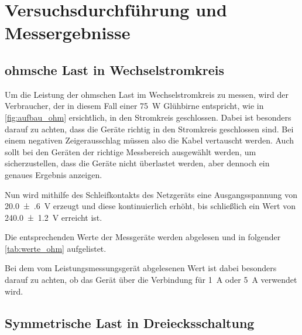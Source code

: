 \documentclass[12pt,english,ngerman]{scrartcl}
\begin{document}
\section{Versuchsdurchführung und Messergebnisse}\label{sec:versuchsdurchfuehrung_messergebnisse}

\subsection{ohmsche Last in Wechselstromkreis}

Um die Leistung der ohmschen Last im Wechselstromkreis zu messen, wird der
Verbraucher, der in diesem Fall einer \SI[]{75}{\watt} Glühbirne entspricht,
wie in \autoref{fig:aufbau_ohm} ersichtlich, in den Stromkreis geschlossen.
Dabei ist besonders darauf zu achten, dass die Geräte richtig in den Stromkreis
geschlossen sind. Bei einem negativen Zeigerausschlag müssen also die Kabel
vertauscht werden. Auch sollt bei den Geräten der richtige Messbereich
ausgewählt werden, um sicherzustellen, dass die Geräte nicht überlastet werden,
aber dennoch ein genaues Ergebnis anzeigen.

Nun wird mithilfe des Schleifkontakts des Netzgeräts eine Ausgangsspannung von
\SI[]{20.0(6)}{\volt} erzeugt und diese kontinuierlich erhöht, bis schließlich
ein Wert von \SI[]{240.0(12)}{\volt} erreicht ist.

Die entsprechenden Werte der Messgeräte werden abgelesen und in folgender
\autoref{tab:werte_ohm} aufgelistet.

Bei dem vom Leistungsmessungsgerät abgelesenen Wert ist dabei besonders darauf
zu achten, ob das Gerät über die Verbindung für \SI{1}{\ampere} oder
\SI{5}{\ampere} verwendet wird.

\begin{table}[H]
	\caption[Gemessene Werte bei der Variation der ohmschen Last]{Gemessene Werte bei der
		Variation der ohmschen Last       \\
		$U \dots$ gemessene Spannung in V \\
		$I \dots$ gemessener Strom in A   \\
		$P \dots$ gemessene Leistung in W
	}\label{tab:werte_ohm}
	\centering
	
\end{table}

\subsection{Symmetrische Last in Dreiecksschaltung}
\end{document}
